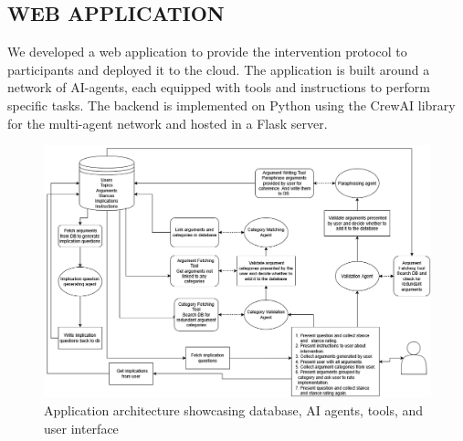 \documentclass[journal]{IEEEtran}
\begin{document}
\subsection{WEB APPLICATION}
\label{section:web-application}
We developed a web application to provide the intervention protocol to participants and deployed it to the cloud. The application is built around a network of AI-agents, each equipped with tools and instructions to perform specific tasks. The backend is implemented on Python using the CrewAI library for the multi-agent network and hosted in a Flask server.
\begin{figure}
	\begin{center}
		\includegraphics[scale=0.23]{Fig/IHP_architecture.png}
	\end{center}
	\caption{Application architecture showcasing database, AI agents, tools, and user interface}
	\label{figure:application-architecture}
\end{figure}
\end{document}
